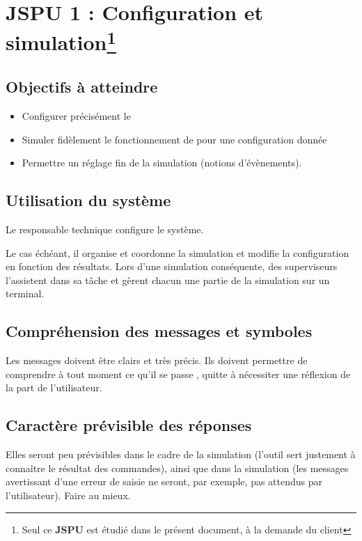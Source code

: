 \section{\textbf{JSPU} 1 : Configuration et simulation\footnote{Seul ce \textbf{JSPU} est étudié dans le présent document, à la demande du client}}

%

\subsection{Objectifs à atteindre}
\begin{itemize}
	\item Configurer précisément le 
	\item Simuler fidèlement le fonctionnement de  pour une configuration donnée
	\item Permettre un réglage fin de la simulation (notions d'évènements).
\end{itemize}

\subsection{Utilisation du système}
Le responsable technique configure le système.

Le cas échéant, il organise et coordonne la simulation et modifie la configuration en fonction des résultats. Lors d'une simulation conséquente, des superviseurs l'assistent dans sa tâche et gèrent chacun une partie de la simulation sur un terminal.

\subsection{Compréhension des messages et symboles}
Les messages doivent être clairs et très précis. Ils doivent permettre de comprendre à tout moment \og ce qu'il se passe \fg, quitte à nécessiter une réflexion de la part de l'utilisateur.

\subsection{Caractère prévisible des réponses}
Elles seront peu prévisibles dans le cadre de la simulation (l'outil sert justement à connaître le résultat des commandes), ainsi que dans la simulation (les messages avertissant d'une erreur de saisie ne seront, par exemple, pas attendus par l'utilisateur). Faire au mieux.

